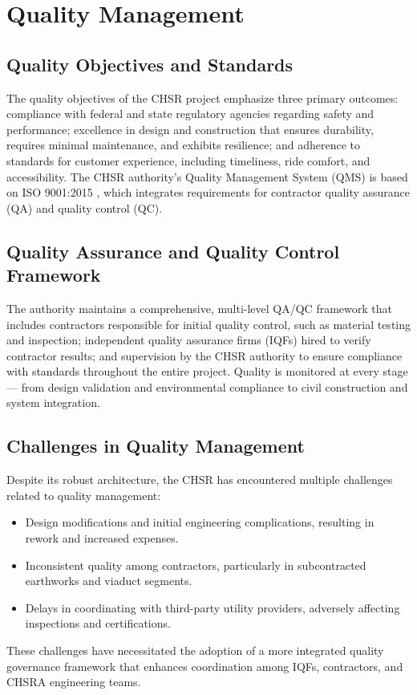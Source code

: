 \chapter{Quality Management}
\section{Quality Objectives and Standards}

\parindent20pt The quality objectives of the CHSR project emphasize three primary outcomes: compliance with federal and state regulatory agencies regarding safety and performance; excellence in design and construction that ensures durability, requires minimal maintenance, and exhibits resilience; and adherence to standards for customer experience, including timeliness, ride comfort, and accessibility. The CHSR authority’s Quality Management System (QMS) is based on ISO 9001:2015 \citep{sustainability2024}, which integrates requirements for contractor quality assurance (QA) and quality control (QC).

\section{Quality Assurance and Quality Control Framework}
The authority maintains a comprehensive, multi-level QA/QC framework that includes contractors responsible for initial quality control, such as material testing and inspection; independent quality assurance firms (IQFs) hired to verify contractor results; and supervision by the CHSR authority to ensure compliance with standards throughout the entire project. Quality is monitored at every stage— from design validation and environmental compliance to civil construction and system integration.

\section{Challenges in Quality Management}
Despite its robust architecture, the CHSR has encountered multiple challenges related to quality management: \begin{itemize}
\item Design modifications and initial engineering complications, resulting in rework and increased expenses.
\item Inconsistent quality among contractors, particularly in subcontracted earthworks and viaduct segments.
\item Delays in coordinating with third-party utility providers, adversely affecting inspections and certifications. \end{itemize}
These challenges have necessitated the adoption of a more integrated quality governance framework that enhances coordination among IQFs, contractors, and CHSRA engineering teams.\par